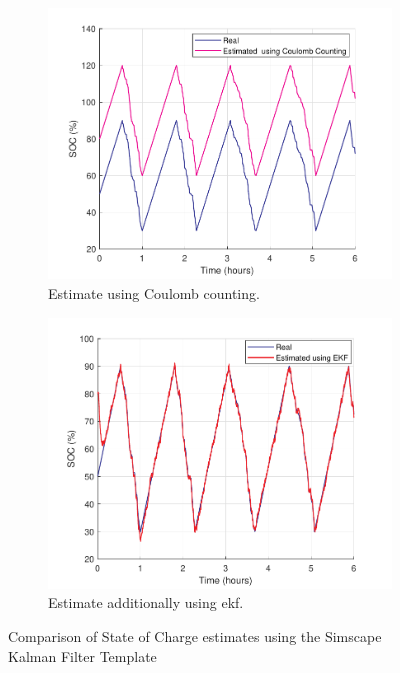 \begin{figure}[H]
    \centering
    \begin{subfigure}[b]{0.49\textwidth} %
        \centering
        \includegraphics[width=\textwidth]{figs/Samuel/Figures/plotsbattest (1) (cropped) (pdfresizer.com).pdf}
        \caption{Estimate using Coulomb counting.}
        \label{fig:coolomb}
    \end{subfigure}
    \hspace{0\textwidth}
    \begin{subfigure}[b]{0.49\textwidth} %
        \centering
        \includegraphics[width=\textwidth]{figs/Samuel/Figures/plotsbattest (1) (cropped) (pdfresizer.com) (1).pdf}
        \caption{Estimate additionally using \gls{ekf}.}
        \label{fig:kalmeff}
    \end{subfigure}
    \caption[Comparison of State of Charge Estimates]{Comparison of State of Charge estimates using the Simscape Kalman Filter Template}
    \label{fig:bmsestimefk}
\end{figure}

